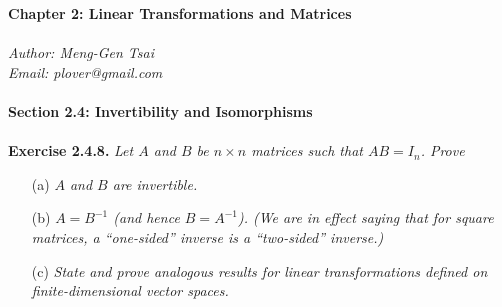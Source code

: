 \documentclass{article}
\begin{document}
\textbf{\Large Chapter 2: Linear Transformations and Matrices} \\\\



\emph{Author: Meng-Gen Tsai} \\
\emph{Email: plover@gmail.com} \\\\









\textbf{\large Section 2.4: Invertibility and Isomorphisms} \\\\



\textbf{Exercise 2.4.8.}
\emph{Let $A$ and $B$ be $n \times n$ matrices such that $AB = I_n$.
Prove}
\begin{enumerate}
\item[(a)]
\emph{$A$ and $B$ are invertible.}
\item[(b)]
\emph{$A = B^{-1}$ (and hence $B = A^{-1}$).
(We are in effect saying that for square matrices,
a ``one-sided'' inverse is a ``two-sided'' inverse.)}
\item[(c)]
\emph{State and prove analogous results for linear transformations
defined on finite-dimensional vector spaces.} \\
\end{enumerate}
\end{document}

